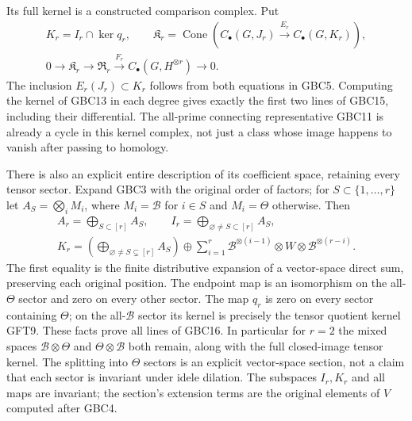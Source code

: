 Its full kernel is a constructed comparison complex. Put
\begin{equation}\tag{GBC15}
 \begin{gathered}
 K_r=I_r\cap\ker q_r,\qquad
 \mathfrak K_r=\operatorname{Cone}(C_\bullet(G,J_r)
                          \xrightarrow{E_r}C_\bullet(G,K_r)),\\
 0\longrightarrow\mathfrak K_r\longrightarrow\mathfrak R_r
       \xrightarrow{F_r}C_\bullet(G,H^{\otimes r})\longrightarrow0.
 \end{gathered}
\end{equation}
The inclusion $E_r(J_r)\subset K_r$ follows from both equations
in GBC5. Computing the kernel of GBC13 in each degree gives
exactly the first two lines of GBC15, including their differential.
The all-prime connecting representative GBC11 is already a cycle
in this kernel complex, not just a class whose image happens to
vanish after passing to homology.

There is also an explicit entire description of its coefficient
space, retaining every tensor sector. Expand GBC3 with the
original order of factors; for $S\subset\{1,\ldots,r\}$ let
$A_S=\bigotimes_i M_i$, where $M_i=\mathscr B$ for $i\in S$
and $M_i=\Theta$ otherwise. Then
\begin{equation}\tag{GBC16}
 \begin{gathered}
 A_r=\bigoplus_{S\subset[r]}A_S,\qquad
 I_r=\bigoplus_{\varnothing\ne S\subset[r]}A_S,\\
 K_r=\left(\bigoplus_{\varnothing\ne S\subsetneq[r]}A_S\right)
       \oplus\sum_{i=1}^r
         \mathscr B^{\otimes(i-1)}\otimes W
                         \otimes\mathscr B^{\otimes(r-i)}.
 \end{gathered}
\end{equation}
The first equality is the finite distributive expansion of a
vector-space direct sum, preserving each original position.
The endpoint map is an isomorphism on the all-$\Theta$ sector
and zero on every other sector. The map $q_r$ is zero on every
sector containing $\Theta$; on the all-$\mathscr B$ sector its
kernel is precisely the tensor quotient kernel GFT9. These facts
prove all lines of GBC16. In particular for $r=2$ the mixed
spaces $\mathscr B\otimes\Theta$ and $\Theta\otimes\mathscr B$
both remain, along with the full closed-image tensor kernel.
The splitting into $\Theta$ sectors is an explicit vector-space
section, not a claim that each sector is invariant under idele
dilation. The subspaces $I_r,K_r$ and all maps are invariant;
the section's extension terms are the original elements of $V$
computed after GBC4.

